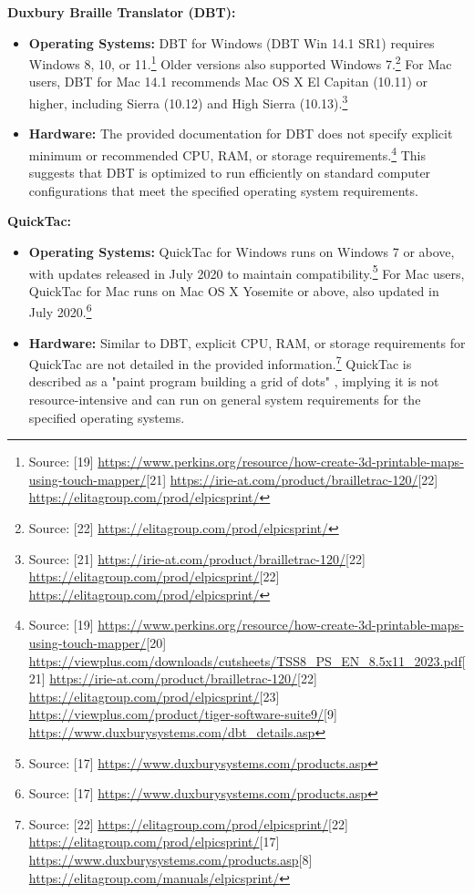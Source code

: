 \textbf{Duxbury Braille Translator (DBT):}
\begin{itemize}
    \item \textbf{Operating Systems:} DBT for Windows (DBT Win 14.1 SR1) requires Windows 8, 10, or 11.\footnote{Source: [19] \url{https://www.perkins.org/resource/how-create-3d-printable-maps-using-touch-mapper/}[21] \url{https://irie-at.com/product/brailletrac-120/}[22] \url{https://elitagroup.com/prod/elpicsprint/}} Older versions also supported Windows 7.\footnote{Source: [22] \url{https://elitagroup.com/prod/elpicsprint/}} For Mac users, DBT for Mac 14.1 recommends Mac OS X El Capitan (10.11) or higher, including Sierra (10.12) and High Sierra (10.13).\footnote{Source: [21] \url{https://irie-at.com/product/brailletrac-120/}[22] \url{https://elitagroup.com/prod/elpicsprint/}[22] \url{https://elitagroup.com/prod/elpicsprint/}}
    \item \textbf{Hardware:} The provided documentation for DBT does not specify explicit minimum or recommended CPU, RAM, or storage requirements.\footnote{Source: [19] \url{https://www.perkins.org/resource/how-create-3d-printable-maps-using-touch-mapper/}[20] \url{https://viewplus.com/downloads/cutsheets/TSS8_PS_EN_8.5x11_2023.pdf}[21] \url{https://irie-at.com/product/brailletrac-120/}[22] \url{https://elitagroup.com/prod/elpicsprint/}[23] \url{https://viewplus.com/product/tiger-software-suite9/}[9] \url{https://www.duxburysystems.com/dbt_details.asp}} This suggests that DBT is optimized to run efficiently on standard computer configurations that meet the specified operating system requirements.
\end{itemize}

\textbf{QuickTac:}
\begin{itemize}
    \item \textbf{Operating Systems:} QuickTac for Windows runs on Windows 7 or above, with updates released in July 2020 to maintain compatibility.\footnote{Source: [17] \url{https://www.duxburysystems.com/products.asp}} For Mac users, QuickTac for Mac runs on Mac OS X Yosemite or above, also updated in July 2020.\footnote{Source: [17] \url{https://www.duxburysystems.com/products.asp}}
    \item \textbf{Hardware:} Similar to DBT, explicit CPU, RAM, or storage requirements for QuickTac are not detailed in the provided information.\footnote{Source: [22] \url{https://elitagroup.com/prod/elpicsprint/}[22] \url{https://elitagroup.com/prod/elpicsprint/}[17] \url{https://www.duxburysystems.com/products.asp}[8] \url{https://elitagroup.com/manuals/elpicsprint/}} QuickTac is described as a "paint program building a grid of dots" \cite{[9]}, implying it is not resource-intensive and can run on general system requirements for the specified operating systems.
\end{itemize}

